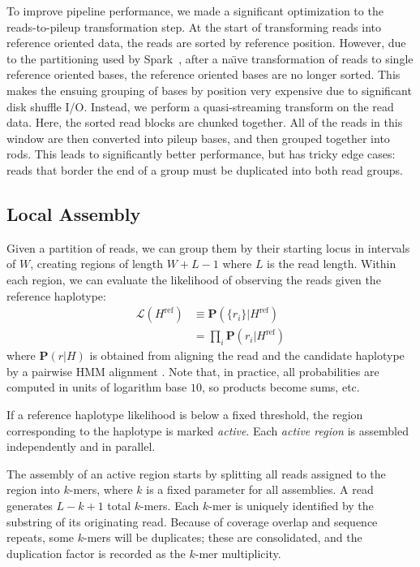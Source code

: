 \documentclass{acm_proc_article-sp}
\begin{document}
To improve pipeline performance, we made a significant optimization to the reads-to-pileup transformation step. At the start of
transforming reads into reference oriented data, the reads are sorted by reference position. However, due to the partitioning
used by Spark~\cite{zaharia10}, after a na\"{\i}ve transformation of reads to single reference oriented bases, the reference
oriented bases are no longer sorted. This makes the ensuing grouping of bases by position very expensive due to significant disk
shuffle I/O. Instead, we perform a quasi-streaming transform on the read data. Here, the sorted read blocks are chunked together.
All of the reads in this window are then converted into pileup bases, and then grouped together into rods. This leads to significantly
better performance, but has tricky edge cases: reads that border the end of a group must be duplicated into both read groups.

\subsection{Local Assembly}
\label{sec:local-assembly}


Given a partition of reads, we can group them by their starting locus in
intervals of $W$, creating regions of length $W+L-1$ where $L$ is the
read length.
Within each region, we can evaluate the likelihood of observing the reads
given the reference haplotype:
\begin{align}
  \mathcal L(H^\text{ref})
  &\equiv\mathbf P(\{r_i\}|H^\text{ref}) \\ \nonumber
  &=\prod_i\mathbf P(r_i|H^\text{ref})
\end{align}
where $\mathbf P(r|H)$ is obtained from aligning the read and the
candidate haplotype by a pairwise HMM alignment \cite{durbin98}.
Note that, in practice, all probabilities are computed in units of logarithm
base $10$, so products become sums, etc.

If a reference haplotype likelihood is below a fixed threshold,
the region corresponding to the haplotype is marked \emph{active}.
Each \emph{active region} is assembled independently and in parallel.


The assembly of an active region starts by splitting all reads assigned to the
region into $k$-mers, where $k$ is a fixed parameter for all assemblies.
A read generates $L-k+1$ total $k$-mers.
Each $k$-mer is uniquely identified by the substring of its originating read.
Because of coverage overlap and sequence repeats, some $k$-mers will be
duplicates;
these are consolidated, and the duplication factor is recorded as the
$k$-mer multiplicity.
\end{document}
